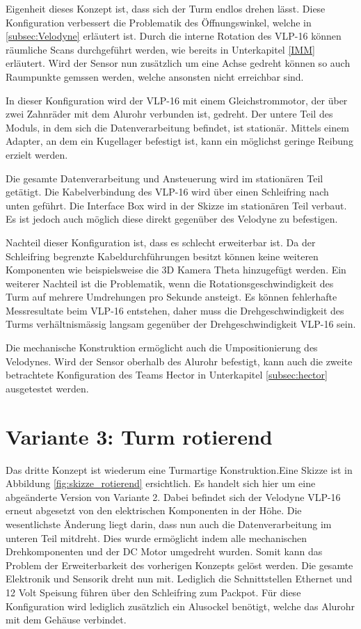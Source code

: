 Eigenheit dieses Konzept ist, dass sich der Turm endlos drehen lässt. Diese Konfiguration verbessert die Problematik des Öffnungswinkel, welche in \ref{subsec:Velodyne} erläutert ist. Durch die interne Rotation des VLP-16 können räumliche Scans durchgeführt werden, wie bereits in Unterkapitel \ref{IMM} erläutert. Wird der Sensor nun zusätzlich um eine Achse gedreht können so auch Raumpunkte gemssen werden, welche ansonsten nicht erreichbar sind.

In dieser Konfiguration wird der VLP-16 mit einem Gleichstrommotor, der über zwei Zahnräder mit dem Alurohr verbunden ist, gedreht. Der untere Teil des Moduls, in dem sich die Datenverarbeitung befindet, ist stationär. Mittels einem Adapter, an dem ein Kugellager befestigt ist, kann ein möglichst geringe Reibung erzielt werden.

Die gesamte Datenverarbeitung und Ansteuerung wird im stationären Teil getätigt. Die Kabelverbindung des VLP-16 wird über einen Schleifring nach unten geführt. Die Interface Box wird in der Skizze im stationären Teil verbaut. Es ist jedoch auch möglich diese direkt gegenüber des Velodyne zu befestigen.

Nachteil dieser Konfiguration ist, dass es schlecht erweiterbar ist. Da der Schleifring begrenzte Kabeldurchführungen besitzt können keine weiteren Komponenten wie beispielsweise die 3D Kamera Theta hinzugefügt werden. Ein weiterer Nachteil ist die Problematik, wenn die Rotationsgeschwindigkeit des Turm auf mehrere Umdrehungen pro Sekunde ansteigt. Es können fehlerhafte Messresultate beim VLP-16 entstehen, daher muss die Drehgeschwindigkeit des Turms verhältnismässig langsam gegenüber der Drehgeschwindigkeit VLP-16 sein.

Die mechanische Konstruktion ermöglicht auch die Umpositionierung des Velodynes. Wird der Sensor oberhalb des Alurohr befestigt, kann auch die zweite betrachtete Konfiguration des Teams Hector in Unterkapitel \ref{subsec:hector} ausgetestet werden.


\section {Variante 3: Turm rotierend}
\label{sec:var3}
Das dritte Konzept ist wiederum eine Turmartige Konstruktion.Eine Skizze ist in Abbildung \ref{fig:skizze_rotierend} ersichtlich. Es handelt sich hier um eine abgeänderte Version von Variante 2. Dabei befindet sich der Velodyne VLP-16 erneut abgesetzt von den elektrischen Komponenten in der Höhe. Die wesentlichste Änderung liegt darin, dass nun auch die Datenverarbeitung im unteren Teil mitdreht. 
Dies wurde ermöglicht indem alle mechanischen Drehkomponenten und der DC Motor umgedreht wurden. Somit kann das Problem der Erweiterbarkeit des vorherigen Konzepts gelöst werden. Die gesamte Elektronik und Sensorik dreht nun mit. Lediglich die Schnittstellen Ethernet und 12 Volt Speisung führen über den Schleifring zum Packpot. Für diese Konfiguration wird lediglich zusätzlich ein Alusockel benötigt, welche das Alurohr mit dem Gehäuse verbindet. 



